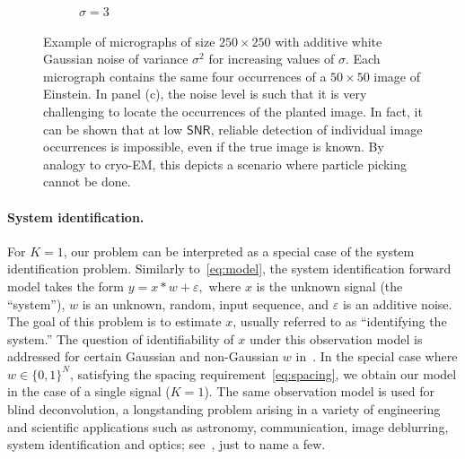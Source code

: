 \documentclass[english,11pt]{article}
\newcommand{\1}{\mathbf{1}}
\newcommand{\TODO}[1]{{\color{red}{[#1]}}}
\numberwithin{equation}{section}
\theoremstyle{plain}
\theoremstyle{definition}
\theoremstyle{remark}
\theoremstyle{plain}
\theoremstyle{remark}
\theoremstyle{plain}
\theoremstyle{plain}
\newcommand{\SNR}{\ensuremath{\textsf{SNR}}}
\begin{document}
\begin{figure}[t]
\begin{subfigure}[h]{0.33\textwidth}
		\caption{$\sigma = 3$}
	\end{subfigure}
	\caption{\label{fig:micro_example} Example of micrographs of size $250\times 250$ with additive white Gaussian noise of variance $\sigma^2$ for increasing values of $\sigma$. Each micrograph contains the same four occurrences of a $50 \times 50$ image of Einstein. In panel (c), the noise level is such that it is very challenging to locate the occurrences of the planted image. In fact, it can be shown that at low $\SNR$, reliable detection of individual image occurrences is impossible, even if the true image is known. By analogy to cryo-EM, this depicts a scenario where particle picking cannot be done.}	
\end{figure}



\paragraph{System identification.}

For $K=1$, our problem can be interpreted as a special case of the system identification problem. Similarly to~\eqref{eq:model}, the system identification forward model takes the form
%
\begin{math}
%
y = x\ast w + \varepsilon,  
%
\end{math} 
%
where $x$ is the unknown signal (the ``system''), $w$ is an unknown, random, input sequence, and $\varepsilon$ is an additive noise.   
The goal of this problem is to estimate $x$, usually referred to as ``identifying the system.'' The question of identifiability of $x$ under this observation model is addressed for certain Gaussian and non-Gaussian $w$ in~\cite{benveniste1980robust,kormylo1983identifiability}. In the special case where $w\in\{0,1\}^N$, satisfying the spacing requirement~\eqref{eq:spacing}, we obtain our model in the  case of a single signal ($K = 1$). The same observation model is used for blind deconvolution, a longstanding problem arising in a variety of engineering and scientific applications such as astronomy, communication, image deblurring, system identification and optics; see~\cite{jefferies1993restoration,shalvi1990new,ayers1988iterative,abed1997blind}, just to name a few. 

\end{document}

